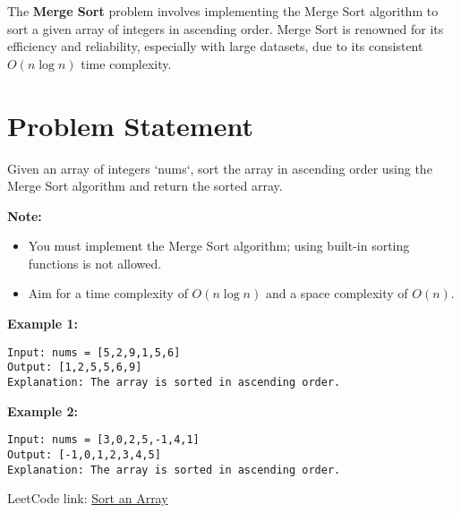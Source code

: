 
\label{problem:merge_sort}

The \textbf{Merge Sort} problem involves implementing the Merge Sort algorithm to sort a given array of integers in ascending order. Merge Sort is renowned for its efficiency and reliability, especially with large datasets, due to its consistent \(O(n \log n)\) time complexity.

\section*{Problem Statement}
Given an array of integers `nums`, sort the array in ascending order using the Merge Sort algorithm and return the sorted array.

\textbf{Note:} 
\begin{itemize}
    \item You must implement the Merge Sort algorithm; using built-in sorting functions is not allowed.
    \item Aim for a time complexity of \(O(n \log n)\) and a space complexity of \(O(n)\).
\end{itemize}

\textbf{Example 1:}

\begin{verbatim}
Input: nums = [5,2,9,1,5,6]
Output: [1,2,5,5,6,9]
Explanation: The array is sorted in ascending order.
\end{verbatim}

\textbf{Example 2:}

\begin{verbatim}
Input: nums = [3,0,2,5,-1,4,1]
Output: [-1,0,1,2,3,4,5]
Explanation: The array is sorted in ascending order.
\end{verbatim}

LeetCode link: \href{https://leetcode.com/problems/sort-an-array/}{Sort an Array}


